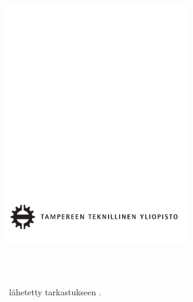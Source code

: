 \makeatletter
\let\thetitle\@title
\let\theauthor\@author
\makeatother

\thispagestyle{empty}

\vspace*{-.5cm}\noindent


\includegraphics[width=8cm]{tty-logo}

\vspace{6.8cm}

\MakeUppercase{{\large\textbf{\textsf{%
\uppercase{\theauthor} \\
\thetitle \\
}}}}
\textsf{\documenttype}

\vspace{8.7cm} %

\begin{flushright}

\begin{minipage}[c]{6.8cm}
\begin{spacing}{1.0}
\begin{flushleft}
\nohyphens{\inspector\ lähetetty tarkastukseen \approvaldate.}
\end{flushleft}
\end{spacing}
\end{minipage}
\end{flushright}

\cleardoublepage
